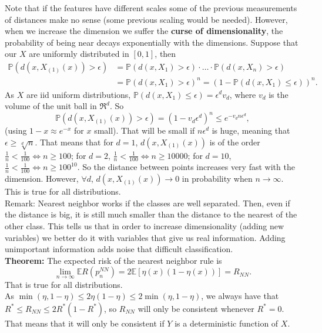 \documentclass[11pt, english]{article}
\begin{document}
Note that if the features have different scales some of the previous measurements of distances make no sense (some previous scaling would be needed). However, when we increase the dimension we suffer the \textbf{curse of dimensionality}, the probability of being near decays exponentially with the dimensions. Suppose that our $X$ are uniformly distributed in $[0,1]$, then
\begin{align}
	\mathbb{P}(d(x,X_{(1)}(x))>\epsilon)&=\mathbb{P}(d(x,X_1)>\epsilon)\cdot\dots\cdot \mathbb{P}(d(x,X_n)>\epsilon)\\ &=\mathbb{P}(d(x,X_1)>\epsilon)^n=(1-\mathbb{P}(d(x,X_1)\leq \epsilon))^n.
\end{align}
As $X$ are iid uniform distributions, $\mathbb{P}(d(x,X_1)\leq \epsilon)=\epsilon^dv_d$, where $v_d$ is the volume of the unit ball in $\Re^d$. So
\begin{equation}
	\mathbb{P}(d(x,X_{(1)}(x))>\epsilon)=(1-v_d\epsilon^d)^n\leq e^{-v_dn\epsilon^d},
\end{equation}
(using $1-x\approx e^{-x}$ for $x$ small). That will be small if $n\epsilon^d$ is huge, meaning that $\epsilon\geq \sqrt[d]{n}$. That means that for $d=1$, $d(x,X_{(1)}(x))$ is of the order $\frac{1}{n}<\frac{1}{100}\Leftrightarrow n\geq 100$; for $d=2$, $\frac{1}{n}<\frac{1}{100}\Leftrightarrow n\geq 10000$; for $d=10$, $\frac{1}{n}<\frac{1}{100}\Leftrightarrow n\geq 100^{10}$. So the distance between points increases very fast with the dimension. However, $\forall d$, $d(x,X_{(1)}(x))\rightarrow 0$ in probability when $n\rightarrow\infty$. This is true for all distributions.\\

Remark: Nearest neighbor works if the classes are well separated. Then, even if the distance is big, it is still much smaller than the distance to the nearest of the other class. This tells us that in order to increase dimensionality (adding new variables) we better do it with variables that give us real information. Adding unimportant information adds noise that difficult classification.\\

\textbf{Theorem:} The expected risk of the nearest neighbor rule is 
\begin{equation}
	\underset{n\rightarrow \infty}{\lim}\mathbb{E}R(p_n^{NN})=2\mathbb{E}[\eta(x)(1-\eta(x))]=R_{NN}.
\end{equation}
That is true for all distributions.\\

As $\min(\eta,1-\eta)\leq2\eta(1-\eta)\leq 2\min(\eta,1-\eta)$, we always have that $R^*\leq R_{NN}\leq 2R^*(1-R^*)$, so $R_{NN}$ will only be consistent whenever $R^*=0$. That means that it will only be consistent if $Y$ is a deterministic function of $X$.\\
\end{document}
